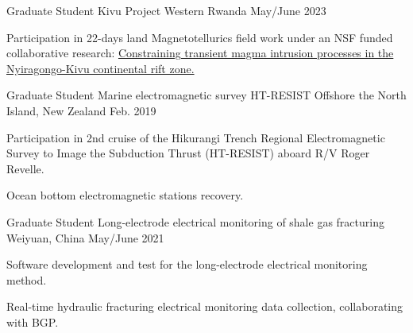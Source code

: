 

\begin{cventries}

  \cventry
    {Graduate Student} %
    {Kivu Project} %
    {Western Rwanda} %
    {May/June 2023} %
    {
      \begin{cvitems} %
        \item {Participation in 22-days land Magnetotellurics field work under an NSF funded collaborative research: \href{https://avnewman.github.io/KIVU/}{Constraining transient magma intrusion processes in the Nyiragongo-Kivu continental rift zone.}}
      \end{cvitems}
    }

  \cventry
    {Graduate Student} %
    {Marine electromagnetic survey HT-RESIST} %
    {Offshore the North Island, New Zealand} %
    {Feb. 2019} %
    {
      \begin{cvitems} %
        \item {Participation in 2nd cruise of the Hikurangi Trench Regional Electromagnetic Survey to Image the Subduction Thrust (HT-RESIST) aboard R/V Roger Revelle.}
        \item {Ocean bottom electromagnetic stations recovery.}
      \end{cvitems}
    }

  \cventry
    {Graduate Student} %
    {Long-electrode electrical monitoring of shale gas fracturing} %
    {Weiyuan, China} %
    {May/June 2021} %
    {
      \begin{cvitems} %
        \item {Software development and test for the long-electrode electrical monitoring method.}
        \item {Real-time hydraulic fracturing electrical monitoring data collection, collaborating with BGP.}
      \end{cvitems}
    }


\end{cventries}
